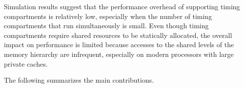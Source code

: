 

Simulation results suggest that the performance overhead of supporting
timing compartments is relatively low, especially when the number of timing
compartments that run simultaneously is small.
Even though timing compartments require shared resources to be statically
allocated, the overall impact on performance is limited because accesses to the
shared levels of the memory hierarchy are infrequent, especially on modern
processors with large private caches.

The following summarizes the main contributions.

